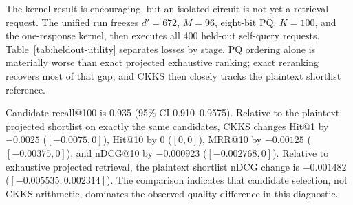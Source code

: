 \documentclass[pdflatex,sn-basic,Numbered]{sn-jnl}
\theoremstyle{plain}
\begin{document}
The kernel result is encouraging, but an isolated circuit is not yet a retrieval request. The unified run freezes $d'=672$, $M=96$, eight-bit PQ, $K=100$, and the one-response kernel, then executes all 400 held-out self-query requests. Table~\ref{tab:heldout-utility} separates losses by stage. PQ ordering alone is materially worse than exact projected exhaustive ranking; exact reranking recovers most of that gap, and CKKS then closely tracks the plaintext shortlist reference.

\begin{table}[t]
\caption{Held-out self-retrieval utility over 400 queries and one million documents. Parentheses are 95\% query-bootstrap intervals from 10,000 resamples. These are diagnostic, single-relevant-item metrics, not graded semantic relevance.}\label{tab:heldout-utility}
\centering
\scriptsize
{}
\end{table}

Candidate recall@100 is 0.935 (95\% CI 0.910--0.9575). Relative to the plaintext projected shortlist on exactly the same candidates, CKKS changes Hit@1 by $-0.0025$ ($[-0.0075,0]$), Hit@10 by 0 ($[0,0]$), MRR@10 by $-0.00125$ ($[-0.00375,0]$), and nDCG@10 by $-0.000923$ ($[-0.002768,0]$). Relative to exhaustive projected retrieval, the plaintext shortlist nDCG change is $-0.001482$ ($[-0.005535,0.002314]$). The comparison indicates that candidate selection, not CKKS arithmetic, dominates the observed quality difference in this diagnostic.
\end{document}
